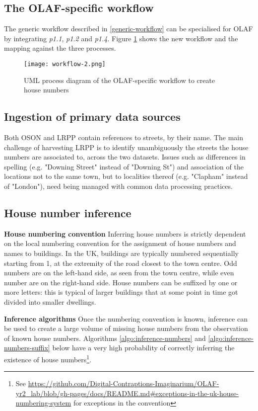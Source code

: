 \subsection{The OLAF-specific workflow}

The generic workflow described in \ref{generic-workflow} can be specialised for OLAF by integrating {\it p1.1}, {\it p1.2} and {\it p1.4}. Figure \ref{fig:workflow_2} shows the new workflow and the mapping against the three processes. 

\begin{figure}
	\texttt{[image: workflow-2.png]}
	\caption{UML process diagram of the OLAF-specific workflow to create house numbers}
	\label{fig:workflow_2}
\end{figure}

\subsection{Ingestion of primary data sources} 

Both OSON and LRPP contain references to streets, by their name. The main challenge of harvesting LRPP is to identify unambiguously the streets the house numbers are associated to, across the two datasets. Issues such as differences in spelling (e.g. "Downing Street" instead of "Downing St") and association of the locations not to the same town, but to localities thereof (e.g. "Clapham" instead of "London"), need being managed with common data processing practices.

\subsection{House number inference} 
\label{inference-algorithms} 

\textbf{House numbering convention} Inferring house numbers is strictly dependent on the local numbering convention for the assignment of house numbers and names to buildings. In the UK, buildings are typically numbered sequentially starting from 1, at the extremity of the road closest to the town centre. Odd numbers are on the left-hand side, as seen from the town centre, while even number are on the right-hand side. House numbers can be suffixed by one or more letters: this is typical of larger buildings that at some point in time got divided into smaller dwellings. 
        
\textbf{Inference algorithms} Once the numbering convention is known, inference can be used to create a large volume of missing house numbers from the observation of known house numbers. Algorithms \ref{algo:inference-numbers} and \ref{algo:inference-numbers-suffix} below have a very high probability of correctly inferring the existence of house numbers\footnote{See \url{https://github.com/Digital-Contraptions-Imaginarium/OLAF-yr2_lab/blob/gh-pages/docs/README.md#exceptions-in-the-uk-house-numbering-system} for exceptions in the convention}. 

